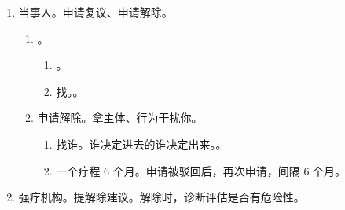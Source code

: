 \begin{enumerate}
\begin{enumerate}
\begin{enumerate}
                \end{enumerate}
          \item 决定强疗。5 日内将文书送给公安。
          \item 二审发现强疗 \ydy 没查清 \yjt 事实不清，证据不足 \yjt 可改可发。
                \begin{enumerate}
                  \item {}。
                  \item {}。
                  \item {}。
                  \item {}。
                \end{enumerate}
        \end{enumerate}
  \item 当事人。申请复议、申请解除。
        \begin{enumerate}
          \item {}。
                \begin{enumerate}
                  \item {}。
                  \item 找。。
                \end{enumerate}
          \item 申请解除。拿主体、行为干扰你。
                \begin{enumerate}
                  \item 找谁。谁决定进去的谁决定出来。。
                  \item 一个疗程 6 个月。申请被驳回后，再次申请，间隔 6 个月。
                \end{enumerate}
        \end{enumerate}
  \item 强疗机构。\yi 提解除建议。\er 解除时，诊断评估是否有危险性。
\end{enumerate}
